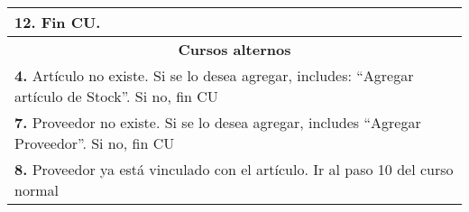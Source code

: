 \begin{longtable}{ |p{8cm}|p{8cm}| }
			\textbf{12. }Fin CU. & \\
		\hline
		\multicolumn{2}{|c|}{\textbf{Cursos alternos}}\\
		\hline
		\multicolumn{2}{|p{16cm}|}{\textbf{4. }Artículo no existe. Si se lo desea agregar, includes: ``Agregar artículo de Stock''. Si no, fin CU }\\
		\hline
		\multicolumn{2}{|p{16cm}|}{\textbf{7. }Proveedor no existe. Si se lo desea agregar, includes ``Agregar Proveedor''. Si no, fin CU}\\
		\hline
		\multicolumn{2}{|p{16cm}|}{\textbf{8. }Proveedor ya está vinculado con el artículo. Ir al paso 10 del curso normal}\\
		\hline	
	\end{longtable}



